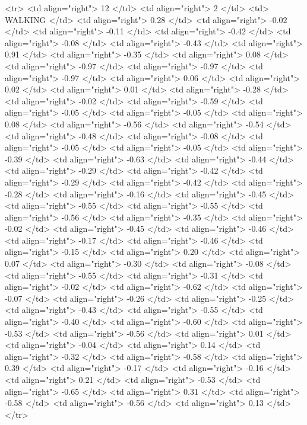   <tr> <td align="right"> 12 </td> <td align="right">   2 </td> <td> WALKING </td> <td align="right"> 0.28 </td> <td align="right"> -0.02 </td> <td align="right"> -0.11 </td> <td align="right"> -0.42 </td> <td align="right"> -0.08 </td> <td align="right"> -0.43 </td> <td align="right"> 0.91 </td> <td align="right"> -0.35 </td> <td align="right"> 0.08 </td> <td align="right"> -0.97 </td> <td align="right"> -0.97 </td> <td align="right"> -0.97 </td> <td align="right"> 0.06 </td> <td align="right"> 0.02 </td> <td align="right"> 0.01 </td> <td align="right"> -0.28 </td> <td align="right"> -0.02 </td> <td align="right"> -0.59 </td> <td align="right"> -0.05 </td> <td align="right"> -0.05 </td> <td align="right"> 0.08 </td> <td align="right"> -0.56 </td> <td align="right"> -0.54 </td> <td align="right"> -0.48 </td> <td align="right"> -0.08 </td> <td align="right"> -0.05 </td> <td align="right"> -0.05 </td> <td align="right"> -0.39 </td> <td align="right"> -0.63 </td> <td align="right"> -0.44 </td> <td align="right"> -0.29 </td> <td align="right"> -0.42 </td> <td align="right"> -0.29 </td> <td align="right"> -0.42 </td> <td align="right"> -0.28 </td> <td align="right"> -0.16 </td> <td align="right"> -0.45 </td> <td align="right"> -0.55 </td> <td align="right"> -0.55 </td> <td align="right"> -0.56 </td> <td align="right"> -0.35 </td> <td align="right"> -0.02 </td> <td align="right"> -0.45 </td> <td align="right"> -0.46 </td> <td align="right"> -0.17 </td> <td align="right"> -0.46 </td> <td align="right"> -0.15 </td> <td align="right"> 0.20 </td> <td align="right"> 0.07 </td> <td align="right"> -0.30 </td> <td align="right"> -0.08 </td> <td align="right"> -0.55 </td> <td align="right"> -0.31 </td> <td align="right"> -0.02 </td> <td align="right"> -0.62 </td> <td align="right"> -0.07 </td> <td align="right"> -0.26 </td> <td align="right"> -0.25 </td> <td align="right"> -0.43 </td> <td align="right"> -0.55 </td> <td align="right"> -0.40 </td> <td align="right"> -0.60 </td> <td align="right"> -0.53 </td> <td align="right"> -0.56 </td> <td align="right"> 0.01 </td> <td align="right"> -0.04 </td> <td align="right"> 0.14 </td> <td align="right"> -0.32 </td> <td align="right"> -0.58 </td> <td align="right"> 0.39 </td> <td align="right"> -0.17 </td> <td align="right"> -0.16 </td> <td align="right"> 0.21 </td> <td align="right"> -0.53 </td> <td align="right"> -0.65 </td> <td align="right"> 0.31 </td> <td align="right"> -0.58 </td> <td align="right"> -0.56 </td> <td align="right"> 0.13 </td> </tr>
